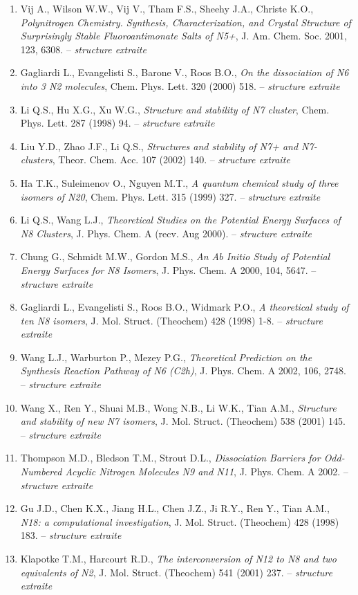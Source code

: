 \begin{enumerate}[leftmargin=1.6cm,itemsep=3pt]
\item Vij A., Wilson W.W., Vij V., Tham F.S., Sheehy J.A., Christe K.O., \emph{Polynitrogen Chemistry. Synthesis, Characterization, and Crystal Structure of Surprisingly Stable Fluoroantimonate Salts of N5+}, J. Am. Chem. Soc. 2001, 123, 6308. -- \textit{structure extraite}
\item Gagliardi L., Evangelisti S., Barone V., Roos B.O., \emph{On the dissociation of N6 into 3 N2 molecules}, Chem. Phys. Lett. 320 (2000) 518. -- \textit{structure extraite}
\item Li Q.S., Hu X.G., Xu W.G., \emph{Structure and stability of N7 cluster}, Chem. Phys. Lett. 287 (1998) 94. -- \textit{structure extraite}
\item Liu Y.D., Zhao J.F., Li Q.S., \emph{Structures and stability of N7+ and N7- clusters}, Theor. Chem. Acc. 107 (2002) 140. -- \textit{structure extraite}
\item Ha T.K., Suleimenov O., Nguyen M.T., \emph{A quantum chemical study of three isomers of N20}, Chem. Phys. Lett. 315 (1999) 327. -- \textit{structure extraite}
\item Li Q.S., Wang L.J., \emph{Theoretical Studies on the Potential Energy Surfaces of N8 Clusters}, J. Phys. Chem. A (recv. Aug 2000). -- \textit{structure extraite}
\item Chung G., Schmidt M.W., Gordon M.S., \emph{An Ab Initio Study of Potential Energy Surfaces for N8 Isomers}, J. Phys. Chem. A 2000, 104, 5647. -- \textit{structure extraite}
\item Gagliardi L., Evangelisti S., Roos B.O., Widmark P.O., \emph{A theoretical study of ten N8 isomers}, J. Mol. Struct. (Theochem) 428 (1998) 1-8. -- \textit{structure extraite}
\item Wang L.J., Warburton P., Mezey P.G., \emph{Theoretical Prediction on the Synthesis Reaction Pathway of N6 (C2h)}, J. Phys. Chem. A 2002, 106, 2748. -- \textit{structure extraite}
\item Wang X., Ren Y., Shuai M.B., Wong N.B., Li W.K., Tian A.M., \emph{Structure and stability of new N7 isomers}, J. Mol. Struct. (Theochem) 538 (2001) 145. -- \textit{structure extraite}
\item Thompson M.D., Bledson T.M., Strout D.L., \emph{Dissociation Barriers for Odd-Numbered Acyclic Nitrogen Molecules N9 and N11}, J. Phys. Chem. A 2002. -- \textit{structure extraite}
\item Gu J.D., Chen K.X., Jiang H.L., Chen J.Z., Ji R.Y., Ren Y., Tian A.M., \emph{N18: a computational investigation}, J. Mol. Struct. (Theochem) 428 (1998) 183. -- \textit{structure extraite}
\item Klapotke T.M., Harcourt R.D., \emph{The interconversion of N12 to N8 and two equivalents of N2}, J. Mol. Struct. (Theochem) 541 (2001) 237. -- \textit{structure extraite}
\end{enumerate}
